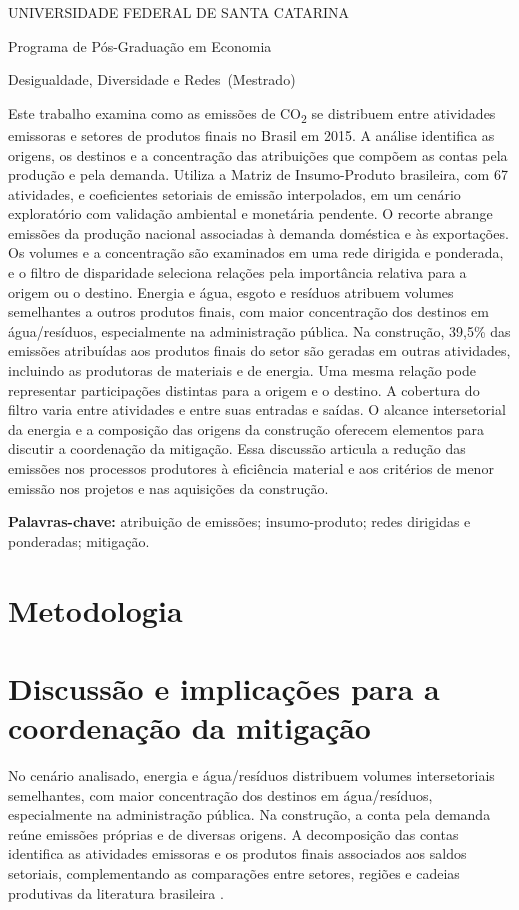 \documentclass[11pt]{article}
\renewenvironment{abstract}{\par\medskip\noindent\textbf{\abstractname}\par\smallskip\small\setstretch{1}\noindent}{\par\medskip}
\newcommand{\instituicao}{UNIVERSIDADE FEDERAL DE SANTA CATARINA}
\newcommand{\departamento}{Programa de Pós-Graduação em Economia}
\newcommand{\curso}{Mestrado}
\newcommand{\disciplina}{Desigualdade, Diversidade e Redes}
\newcommand{\titulo}{Rede de emissões de CO\textsubscript{2} no Brasil}
\newcommand{\autor}{Gabriel Pincelli Cintra}
\newcommand{\local}{Florianópolis}
\newcommand{\dataentrega}{18 de outubro de 2026}
\newcommand{\imprimirtitulodois}{
\begin{center}
  {\small\MakeUppercase{\instituicao}\par}
  {\small \departamento\par}
  {\small \disciplina\ (\curso)\par}
  \vspace{1em}{\LARGE\bfseries \titulo\par}
  \vspace{0.7em}{\normalsize \autor\par}
  \vspace{0.3em}{\small \local, \dataentrega\par}
\end{center}
\vspace{0.4em}}
\begin{document}
\imprimirtitulodois
\thispagestyle{empty}
\begin{abstract}
Este trabalho examina como as emissões de CO\textsubscript{2} se distribuem entre atividades emissoras e setores de produtos finais no Brasil em 2015. A análise identifica as origens, os destinos e a concentração das atribuições que compõem as contas pela produção e pela demanda. Utiliza a Matriz de Insumo-Produto brasileira, com 67 atividades, e coeficientes setoriais de emissão interpolados, em um cenário exploratório com validação ambiental e monetária pendente. O recorte abrange emissões da produção nacional associadas à demanda doméstica e às exportações. Os volumes e a concentração são examinados em uma rede dirigida e ponderada, e o filtro de disparidade seleciona relações pela importância relativa para a origem ou o destino. Energia e água, esgoto e resíduos atribuem volumes semelhantes a outros produtos finais, com maior concentração dos destinos em água/resíduos, especialmente na administração pública. Na construção, 39,5\% das emissões atribuídas aos produtos finais do setor são geradas em outras atividades, incluindo as produtoras de materiais e de energia. Uma mesma relação pode representar participações distintas para a origem e o destino. A cobertura do filtro varia entre atividades e entre suas entradas e saídas. O alcance intersetorial da energia e a composição das origens da construção oferecem elementos para discutir a coordenação da mitigação. Essa discussão articula a redução das emissões nos processos produtores à eficiência material e aos critérios de menor emissão nos projetos e nas aquisições da construção.
\end{abstract}
\noindent\textbf{Palavras-chave:} atribuição de emissões; insumo-produto; redes dirigidas e ponderadas; mitigação.

\clearpage

\clearpage
\section{Metodologia}



\clearpage

\clearpage
\section{Discussão e implicações para a coordenação da mitigação}

No cenário analisado, energia e água/resíduos distribuem volumes intersetoriais semelhantes, com maior concentração dos destinos em água/resíduos, especialmente na administração pública. Na construção, a conta pela demanda reúne emissões próprias e de diversas origens. A decomposição das contas identifica as atividades emissoras e os produtos finais associados aos saldos setoriais, complementando as comparações entre setores, regiões e cadeias produtivas da literatura brasileira \parencite{imori2015,sanguinetAzzoni2024,montoyaEtAl2026}.
\end{document}
